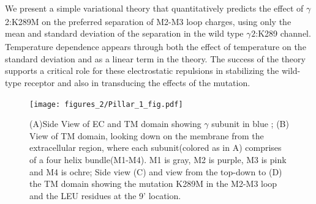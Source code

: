 \documentclass[9pt,twocolumn,twoside,lineno]{pnas-new}
\begin{document}
We present a simple variational theory that quantitatively predicts the effect of $\gamma_{}$2:K289M on the preferred separation of M2-M3 loop charges, using only the mean and standard deviation of the separation in the wild type $\gamma_{}2$:K289 channel. Temperature dependence appears through both the effect of temperature on the standard deviation and as a linear term in the theory.  The success of the theory supports a critical role for these electrostatic repulsions in stabilizing the wild-type receptor and also in transducing the effects of the mutation.  

 
\begin{figure}
\centering
\texttt{[image: figures\_2/Pillar\_1\_fig.pdf]}
\caption{(A)Side View of EC  and TM domain showing $\gamma$ subunit in blue ; (B) View of TM domain, looking down on the membrane from the extracellular region, where each subunit(colored as in A) comprises of a four helix bundle(M1-M4). M1 is gray, M2 is purple, M3 is pink and M4 is ochre; Side view (C) and view from the top-down to (D) the TM domain showing the mutation K289M in the M2-M3 loop and the LEU residues at the 9' location.}
\end{figure}
\end{document}
